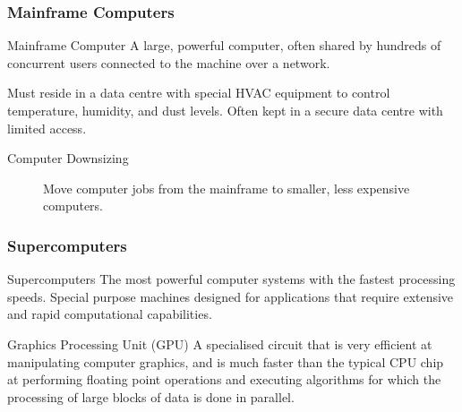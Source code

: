 \documentclass[\main/notes.tex]{subfiles}
\begin{document}
				\subsubsection{Mainframe Computers}
					\begin{definition}{Mainframe Computer}
						A large, powerful computer, often shared by hundreds of concurrent users connected to the machine over a network.

						Must reside in a data centre with special HVAC equipment to control temperature, humidity, and dust levels. Often kept in a secure data centre with limited access.

						\begin{description}
							\item[Computer Downsizing] Move computer jobs from the mainframe to smaller, less expensive computers.
						\end{description}
					\end{definition}
				\subsubsection{Supercomputers}
					\begin{definition}{Supercomputers}
						The most powerful computer systems with the fastest processing speeds. Special purpose machines designed for applications that require extensive and rapid computational capabilities.
					\end{definition}
					\begin{definition}{Graphics Processing Unit (GPU)}
						A specialised circuit that is very efficient at manipulating computer graphics, and is much faster than the typical CPU chip at performing floating point operations and executing algorithms for which the processing of large blocks of data is done in parallel.
					\end{definition}
\end{document}
